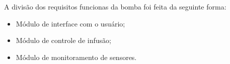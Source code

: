 A divisão dos requisitos funcionas da bomba foi feita da seguinte forma:
\begin{itemize}
\item Módulo de interface com o usuário;
\item Módulo de controle de infusão;
\item Módulo de monitoramento de sensores.
\end{itemize}